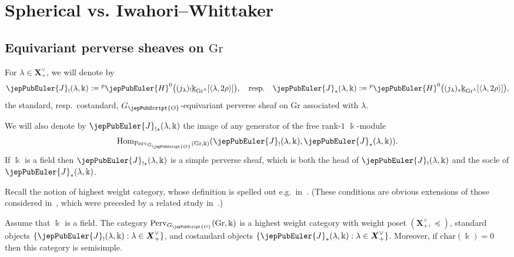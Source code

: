 \section{Spherical vs. Iwahori--Whittaker}
\label{jep104local029}

\subsection{Equivariant perverse sheaves on \texorpdfstring{$\mathrm{Gr}$}{Gr}}
\label{jep104local032}

For $\lambda \in \boldsymbol{X}^\vee_+$, we will denote by
\[
\jepPubEuler{J}_!(\lambda,\Bbbk):= {}^{p}\jepPubEuler{H}^0 \bigl( (j_\lambda)_! \underline{\Bbbk}_{\mathrm{Gr}^\lambda}[\langle \lambda, 2\rho \rangle] \bigr), \quad \text{resp.} \quad \jepPubEuler{J}_*(\lambda,\Bbbk):= {}^{p}\jepPubEuler{H}^0 \bigl( (j_\lambda)_* \underline{\Bbbk}_{\mathrm{Gr}^\lambda}[\langle \lambda, 2\rho \rangle] \bigr),
\]
the standard, resp.~costandard, $G_{\jepPubScript{O}}$-equivariant perverse sheaf on $\mathrm{Gr}$ associated with $\lambda$.

We will also denote by $\jepPubEuler{J}_{!*}(\lambda,\Bbbk)$ the image of any generator of the free rank-$1$ $\Bbbk$-module
\[
\operatorname{Hom}_{\mathrm{Perv}_{G_{\jepPubScript{O}}}(\mathrm{Gr}, \Bbbk)}(\jepPubEuler{J}_!(\lambda,\Bbbk), \jepPubEuler{J}_*(\lambda,\Bbbk)).
\]
If $\Bbbk$ is a field then $\jepPubEuler{J}_{!*}(\lambda,\Bbbk)$ is a simple perverse sheaf, which is both the head of $\jepPubEuler{J}_!(\lambda,\Bbbk)$ and the socle of $\jepPubEuler{J}_*(\lambda,\Bbbk)$.

Recall the notion of highest weight category, whose definition is spelled out e.g.~in~\cite[Def.~7.1]{jep104ref40}. (These conditions are obvious extensions of those considered in~\cite[\S 3.2]{jep104ref14}, which were preceded by a related study in~\cite{jep104ref20}.)

\begin{lem}
\label{jep104local015}
Assume that $\Bbbk$ is a field.
The category $\mathrm{Perv}_{G_{\jepPubScript{O}}}(\mathrm{Gr}, \Bbbk)$ is a highest weight category with weight poset $(\boldsymbol{X}^\vee_+, \preccurlyeq)$, standard objects $\{\jepPubEuler{J}_!(\lambda,\Bbbk) : \lambda \in \boldsymbol{X}^\vee_+\}$, and costandard objects $\{\jepPubEuler{J}_*(\lambda,\Bbbk) : \lambda \in \boldsymbol{X}^\vee_+\}$. Moreover, if $\mathrm{char}(\Bbbk)=0$ then this category is semisimple.
\end{lem}

